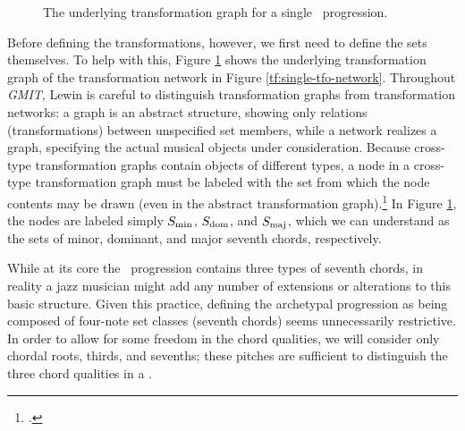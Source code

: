 \begin{figure}[tbp]
  \caption{The underlying transformation graph for a single \tfo\ progression.}
  \label{tf:single-tfo-graph}
\end{figure}

Before defining the transformations, however, we first need to define the sets
themselves. To help with this, Figure \ref{tf:single-tfo-graph} shows the
underlying transformation graph of the transformation network in Figure
\ref{tf:single-tfo-network}. Throughout \emph{GMIT}, Lewin is careful to
distinguish transformation graphs from transformation networks: a graph is an
abstract structure, showing only relations (transformations) between
unspecified set members, while a network realizes a graph, specifying the
actual musical objects under consideration. Because cross-type
transformation graphs contain objects of different types, a node in a
cross-type transformation graph must be labeled with the set from which the
node contents may be drawn (even in the abstract transformation
graph).\footcite[7]{hook:2007} In Figure \ref{tf:single-tfo-graph}, the nodes
are labeled simply $S_{\mathrm{min}}$, $S_{\mathrm{dom}}$, and $S_{\mathrm{maj}}$, which we can understand as the
sets of minor, dominant, and major seventh chords, respectively.

While at its core the \tfo\ progression contains three types of seventh
chords, in reality a jazz musician might add any number of extensions or
alterations to this basic structure. Given this practice, defining the
archetypal progression as being composed of four-note set classes (seventh
chords) seems unnecessarily restrictive. In order to allow for some freedom in
the chord qualities, we will consider only chordal roots, thirds, and
sevenths; these pitches are sufficient to distinguish the three chord
qualities in a \tfo.


